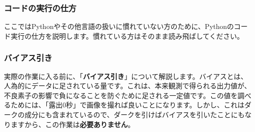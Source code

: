 \subsubsection{コードの実行の仕方}
ここではPythonやその他言語の扱いに慣れていない方のために、Pythonのコード実行の仕方を説明します。慣れている方はそのまま読み飛ばしてください。

\subsubsection{バイアス引き}
実際の作業に入る前に、「\textbf{バイアス引き}」について解説します。バイアスとは、人為的にデータに足されている量です。これは、本来観測で得られる出力値が、不良素子の影響で負になることを防ぐために足される一定値です。この値を調べるためには、「露出$0$秒」で画像を撮れば良いことになります。しかし、これはダークの成分にも含まれているので、ダークを引けばバイアスを引いたことにもなりますから、この作業は\textbf{必要ありません}。

